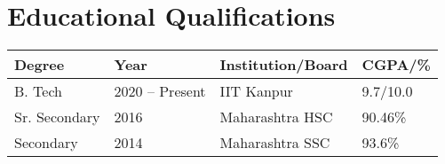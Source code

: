 \setlength\extrarowheight{3pt}  %

\section*{Educational Qualifications}
\begin{tabularx}{\textwidth}{L L L L}

\toprule
\textbf{Degree} & \textbf{Year} & \textbf{Institution/Board} & \textbf{CGPA/\%}\\
\midrule
B. Tech & 2020 -- Present & IIT Kanpur & 9.7/10.0\\%
Sr. Secondary & 2016 & Maharashtra HSC & 90.46\%\\
Secondary & 2014 & Maharashtra SSC & 93.6\%\\
\bottomrule

\end{tabularx}
